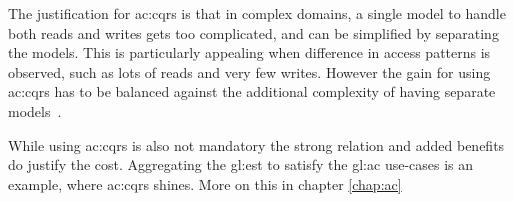The justification for \gls{ac:cqrs} is that in complex domains, a single model to handle both reads and writes gets too complicated, and can be simplified by separating the models. This is particularly appealing when difference in access patterns is observed, such as lots of reads and very few writes. However the gain for using \gls{ac:cqrs} has to be balanced against the additional complexity of having separate models~\citep{esvsed}.

While using \gls{ac:cqrs} is also not mandatory the strong relation and added benefits do justify the cost. Aggregating the \gls{gl:est} to satisfy the \gls{gl:ac} use-cases is an example, where \gls{ac:cqrs} shines. More on this in chapter \ref{chap:ac}







